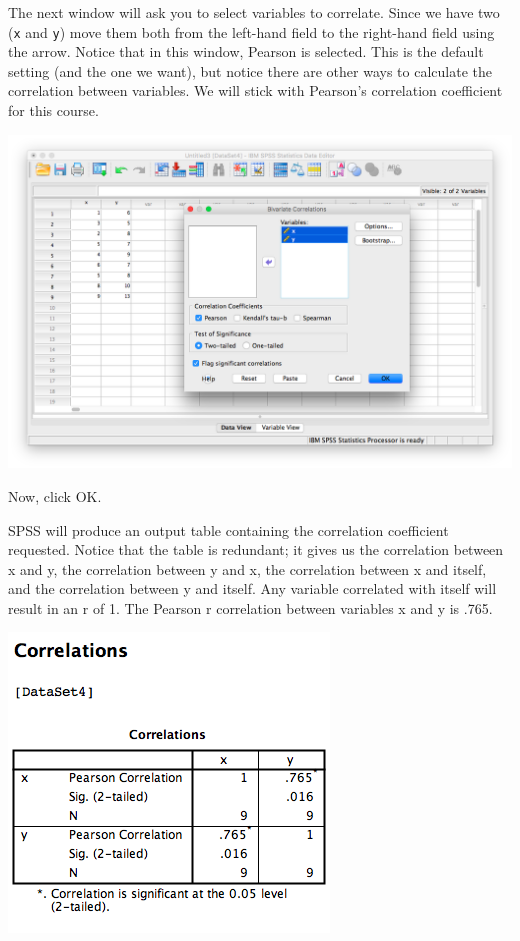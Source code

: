 \documentclass[
]{book}
\begin{document}
The next window will ask you to select variables to correlate. Since we have two (\texttt{x} and \texttt{y}) move them both from the left-hand field to the right-hand field using the arrow. Notice that in this window, {Pearson} is selected. This is the default setting (and the one we want), but notice there are other ways to calculate the correlation between variables. We will stick with Pearson's correlation coefficient for this course.

\includegraphics{img/3.4.13.png}

Now, click {OK}.

SPSS will produce an output table containing the correlation coefficient requested. Notice that the table is redundant; it gives us the correlation between x and y, the correlation between y and x, the correlation between x and itself, and the correlation between y and itself. Any variable correlated with itself will result in an r of 1. The Pearson r correlation between variables x and y is .765.

\includegraphics{img/3.4.14.png}
\end{document}
